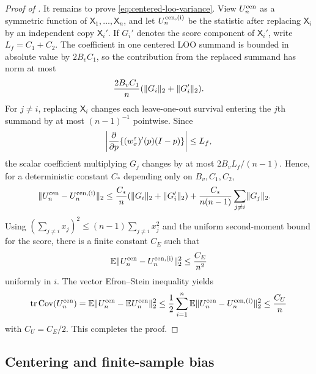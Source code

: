 \begin{proof}[Proof of ]
It remains to prove \eqref{eq:centered-loo-variance}.  View $U_n^{\rm cen}$ as a symmetric function of $\mathsf X_1,\ldots,\mathsf X_n$, and let $U_n^{\rm cen,(i)}$ be the statistic after replacing $\mathsf X_i$ by an independent copy $\mathsf X_i'$.  If $G_i'$ denotes the score component of $\mathsf X_i'$, write $L_f=C_1+C_2$.  The coefficient in one centered LOO summand is bounded in absolute value by $2B_vC_1$, so the contribution from the replaced summand has norm at most
\[
 \frac{2B_vC_1}{n}(\lVert G_i\rVert_2+\lVert G_i'\rVert_2).
\]
For $j\ne i$, replacing $\mathsf X_i$ changes each leave-one-out survival entering the $j$th summand by at most $(n-1)^{-1}$ pointwise.  Since
\[
 \left|\frac{\partial}{\partial p}\{(w_\sigma^\varepsilon)'(p)(I-p)\}\right|
 \le L_f,
\]
the scalar coefficient multiplying $G_j$ changes by at most
$2B_vL_f/(n-1)$.  Hence, for a deterministic constant $C_*$ depending only on $B_v,C_1,C_2$,
\begin{align*}
 \lVert U_n^{\rm cen}-U_n^{\rm cen,(i)}\rVert_2
 &\le \frac{C_*}{n}(\lVert G_i\rVert_2+\lVert G_i'\rVert_2)
 +\frac{C_*}{n(n-1)}\sum_{j\ne i}\lVert G_j\rVert_2.
\end{align*}
Using $(\sum_{j\ne i}x_j)^2\le(n-1)\sum_{j\ne i}x_j^2$ and the uniform second-moment bound for the score, there is a finite constant $C_E$ such that
\[
 \mathbb E\lVert U_n^{\rm cen}-U_n^{\rm cen,(i)}\rVert_2^2
 \le\frac{C_E}{n^2}
\]
uniformly in $i$.  The vector Efron--Stein inequality yields
\[
 \operatorname{tr}\operatorname{Cov}(U_n^{\rm cen})
 =\mathbb E\lVert U_n^{\rm cen}-\mathbb E U_n^{\rm cen}\rVert_2^2
 \le\frac12\sum_{i=1}^{n}
 \mathbb E\lVert U_n^{\rm cen}-U_n^{\rm cen,(i)}\rVert_2^2
 \le\frac{C_U}{n}
\]
with $C_U=C_E/2$.  This completes the proof.
\end{proof}


\subsection{Centering and finite-sample bias}

